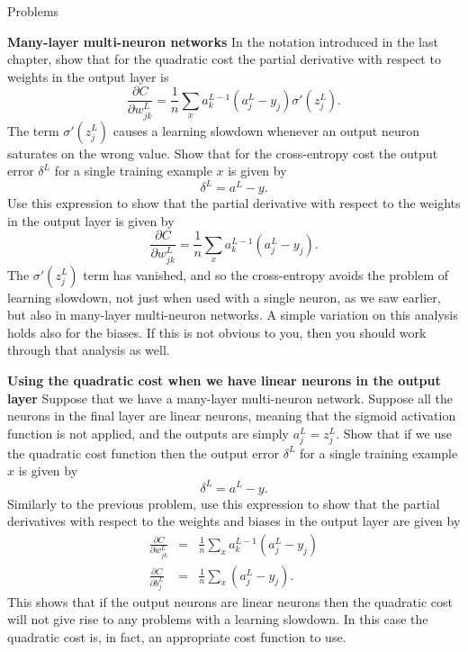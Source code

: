 \documentclass[a4paper,twoside,10pt]{book}
\begin{document}
\begin{exercize}{Problems}
	\item \textbf{Many-layer multi-neuron networks} In the notation introduced in the last chapter, show that for the quadratic cost the partial derivative with respect to weights in the output layer is
	\begin{equation}
		\frac{\partial C}{\partial w^L_{jk}}  = \frac{1}{n}
		\sum_x a^{L-1}_k  (a^L_j-y_j) \sigma'(z^L_j).
		\label{eq:65}
	\end{equation}%
	The term $\sigma'(z^L_j)$ causes a learning slowdown whenever an output neuron saturates on the wrong value. Show that for the cross-entropy cost the output error 
	$\delta^L$ for a single training example $x$ is given by
	\begin{equation}
		\delta^L = a^L - y.\label{eq:66}
	\end{equation}%
	Use this expression to show that the partial derivative with respect to the weights in the output layer is given by
	\begin{equation}
		\frac{\partial C}{\partial w^L_{jk}}  =  \frac{1}{n} \sum_x 	a^{L-1}_k  (a^L_j-y_j).
		\label{eq:67}
	\end{equation}%
	The $\sigma'(z^L_j)$ term has vanished, and so the cross-entropy avoids the problem of learning slowdown, not just when used with a single neuron, as we saw earlier, but also in many-layer multi-neuron networks. A simple variation on this analysis holds also for the biases. If this is not obvious to you, then you should work through that analysis as well.
	\item \textbf{Using the quadratic cost when we have linear neurons in the output layer} Suppose that we have a many-layer multi-neuron network. Suppose all the neurons in the final layer are linear neurons, meaning that the sigmoid activation function is not applied, and the outputs are simply $a^L_j=z^L_j$. Show that if we use the quadratic cost function then the output error $\delta^L$ for a single training example $x$ is given by
	\begin{equation}
		\delta^L = a^L-y.
		\label{eq:68}
	\end{equation}%
	Similarly to the previous problem, use this expression to show that the partial derivatives with respect to the weights and biases in the output layer are given by
	\begin{eqnarray}
	\frac{\partial C}{\partial w^L_{jk}} & = & \frac{1}{n} \sum_x a^{L-1}_k  (a^L_j-y_j)\\
	\frac{\partial C}{\partial b^L_{j}} & = & \frac{1}{n} \sum_x (a^L_j-y_j).
	\label{eq:70}
	\end{eqnarray}
	This shows that if the output neurons are linear neurons then the quadratic cost will not give rise to any problems with a learning slowdown. In this case the quadratic cost is, in fact, an appropriate cost function to use.
\end{exercize}
\end{document}
